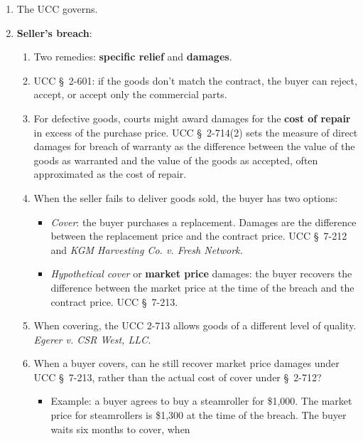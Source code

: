 \begin{enumerate}
\begin{enumerate}
        \item The UCC governs.
        \item \textbf{Seller's breach}:
        \begin{enumerate}
            \item Two remedies: \textbf{specific relief} and \textbf{damages}.
            \item UCC \S\ 2-601: if the goods don't match the contract, the 
            buyer can reject, accept, or accept only the commercial parts.
            \item For defective goods, courts might award damages for the 
            \textbf{cost of repair} in excess of the purchase price.  UCC \S\ 
            2-714(2) sets the measure of direct damages for breach of warranty 
            as the difference between the value of the goods as warranted and 
            the value of the goods as accepted, often approximated as the cost 
            of repair.
            \item When the seller fails to deliver goods sold, the buyer has 
            two options:
            \begin{itemize}
                \item \emph{Cover}: the buyer purchases a replacement. Damages 
                are the difference between the replacement price and the 
                contract price. UCC \S\ 7-212 and \emph{KGM Harvesting Co. v. 
                Fresh Network.}
                \item \emph{Hypothetical cover} or \textbf{market price} 
                damages: the buyer recovers the difference between the market 
                price at the time of the breach and the contract price. UCC 
                \S\ 7-213.
            \end{itemize}
            \item When covering, the UCC 2-713 allows goods of a different 
            level of quality. \emph{Egerer v. CSR West, LLC.}
            \item When a buyer covers, can he still recover market price 
            damages under UCC \S\ 7-213, rather than the actual cost of cover 
            under \S\ 2-712?
            \begin{itemize}
                \item Example: a buyer agrees to buy a steamroller for 
                \$1,000. The market price for steamrollers is \$1,300 at the 
                time of the breach. The buyer waits six months to cover, when 

\end{itemize}
\end{enumerate}
\end{enumerate}
\end{enumerate}
